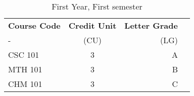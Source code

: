 \documentclass{article}
\begin{document}
	
\begin{table}[h!]
	\begin{center}
      \caption{First Year, First semester}
      \label{tab:table1}
      \begin{tabular}{l|c|r|c}
      	\textbf{Course Code} & \textbf{Credit Unit} & 
      	\textbf{Letter Grade}\\
      	- & (CU) & (LG) \\ 
      	\hline
      	CSC 101 & 3 & A\\
      	MTH 101 & 3 & B\\
      	CHM 101 & 3 & C\\
      \end{tabular}		
	\end{center}
\end{table}

	
\end{document}
